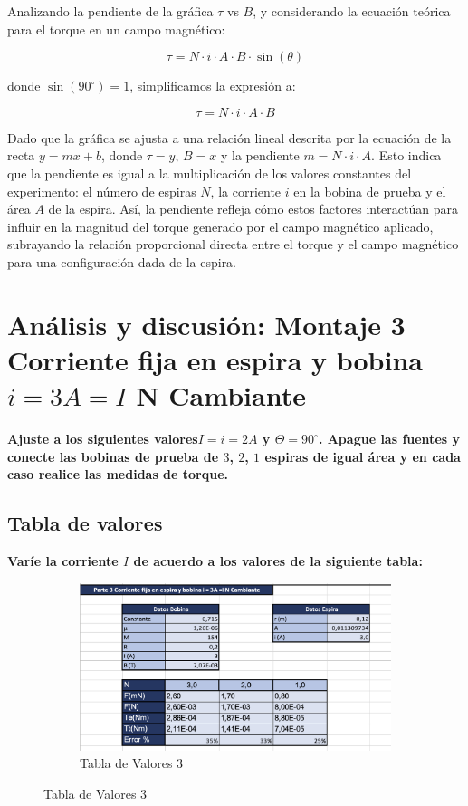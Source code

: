 Analizando la pendiente de la gráfica $\tau$ vs $B$, y considerando la ecuación teórica para el torque en un campo magnético:

\[
\tau = N \cdot i \cdot A \cdot B \cdot \sin(\theta)
\]

donde $\sin(90^\circ) = 1$, simplificamos la expresión a:

\[
\tau = N \cdot i \cdot A \cdot B
\]

Dado que la gráfica se ajusta a una relación lineal descrita por la ecuación de la recta \(y = mx + b\), donde \(\tau = y\), \(B = x\) y la pendiente \(m = N \cdot i \cdot A\). Esto indica que la pendiente es igual a la multiplicación de los valores constantes del experimento: el número de espiras \(N\), la corriente \(i\) en la bobina de prueba y el área \(A\) de la espira. Así, la pendiente refleja cómo estos factores interactúan para influir en la magnitud del torque generado por el campo magnético aplicado, subrayando la relación proporcional directa entre el torque y el campo magnético para una configuración dada de la espira.

\section{Análisis y discusión: Montaje 3 Corriente fija en espira y bobina $i = 3A = I$ N Cambiante}
\textbf{Ajuste a los siguientes valores$I = i = 2A$ y $\Theta = 90^{\circ}$. Apague las fuentes y conecte
las bobinas de prueba de $3$, $2$, $1$ espiras de igual área y en cada caso realice las
medidas de torque.}
\subsection{Tabla de valores}
\textbf{Varíe la corriente $I$ de acuerdo a los valores de la siguiente tabla:}

\begin{figure}[H]
  \centering
  \begin{subfigure}[b]{\textwidth}
      \centering
      \includegraphics[width=\textwidth]{Figures/1. Content/tabla3.png}
      \caption{Tabla de Valores 3}
      \label{fig: Tabla 3}
  \end{subfigure}
  \hfill
\end{figure}


